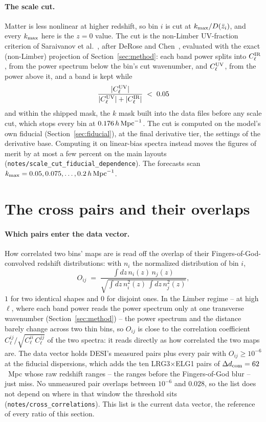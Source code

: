 \documentclass[11pt]{article}
\newcommand{\kmax}{k_{\rm max}}
\newcommand{\hMpc}{\,h\,{\rm Mpc}^{-1}}
\newcommand{\NcrossExtra}{ten}
\newcommand{\kMask}{0.176}
\newcommand{\OvThreshold}{10^{-6}}
\newcommand{\OvGapTop}{0.028}
\begin{document}
\paragraph{The scale cut.}
Matter is less nonlinear at higher redshift, so bin $i$ is cut at
$\kmax/D(\bar{z}_i)$, and every $\kmax$ here is the $z = 0$ value.  The
cut is the non-Limber UV-fraction criterion of Saraivanov et
al.~\cite{Saraivanov2026}, after DeRose and Chen~\cite{DeRoseChen2025},
evaluated with the exact (non-Limber) projection of
Section~\ref{sec:method}: each band power splits into $C_\ell^{\rm IR}$, from the power spectrum
below the bin's cut wavenumber, and $C_\ell^{\rm UV}$, from the power
above it, and a band is kept while
\begin{equation}
  \frac{|C_\ell^{\rm UV}|}{|C_\ell^{\rm UV}| + |C_\ell^{\rm IR}|}
  \;<\; 0.05
  \label{eq:uvfraction}
\end{equation}
and within the shipped mask, the $k$ mask built into the data files
before any scale cut, which stops every bin at $\kMask\hMpc$.
The cut is computed on the model's own fiducial
(Section~\ref{sec:fiducial}), at the final derivative tier, the
settings of the derivative base.  Computing it on linear-bias spectra
instead moves the figures of merit by at most a few percent on the
main layouts
(\texttt{notes/scale\_cut\_fiducial\_dependence}).  The forecasts scan
$\kmax = 0.05, 0.075, \ldots, 0.2\hMpc$.

\section{The cross pairs and their overlaps}
\label{sec:pairs}

\paragraph{Which pairs enter the data vector.}
How correlated two bins' maps are is read off the overlap of their
Fingers-of-God-convolved redshift distributions: with $n_i$ the
normalized distribution of bin $i$,
\begin{equation}
  O_{ij} \;=\; \frac{\int dz\, n_i(z)\, n_j(z)}
  {\sqrt{\int dz\, n_i^2(z)\,\int dz\, n_j^2(z)}} ,
  \label{eq:overlap}
\end{equation}
$1$ for two identical shapes and $0$ for disjoint ones.  In the Limber
regime -- at high $\ell$, where each band power reads the power
spectrum only at one transverse wavenumber (Section~\ref{sec:method})
-- the power spectrum and the distance barely change across two thin
bins, so $O_{ij}$ is close to the correlation coefficient
$C_\ell^{ij}/\sqrt{C_\ell^{ii}\,C_\ell^{jj}}$ of the two spectra: it
reads directly as how correlated the two maps are.
The data vector holds DESI's measured pairs plus every pair with
$O_{ij} \ge \OvThreshold$ at the fiducial dispersions, which adds the
\NcrossExtra{} LRG3$\times$ELG1 pairs of
$\Delta d_{\rm com} = 62$~Mpc whose raw redshift ranges -- the
ranges before the Fingers-of-God blur -- just miss.  No
unmeasured pair overlaps between $\OvThreshold$ and $\OvGapTop$, so
the list does not depend on where in that window the threshold sits
(\texttt{notes/cross\_correlations}).  This list is the current data
vector, the reference of every ratio of this section.
\end{document}
